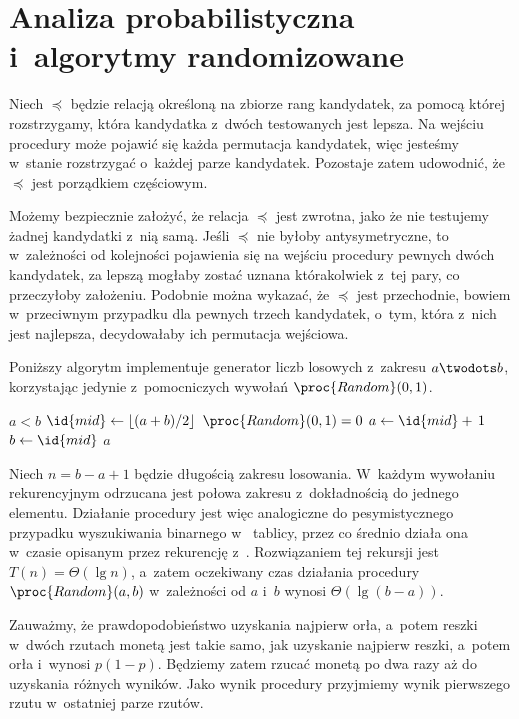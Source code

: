 \chapter{Analiza probabilistyczna i~algorytmy randomizowane}


\exercise %
Niech $\preceq$ będzie relacją określoną na zbiorze rang kandydatek, za pomocą której rozstrzygamy, która kandydatka z~dwóch testowanych jest lepsza. Na wejściu procedury  może pojawić się każda permutacja kandydatek, więc jesteśmy w~stanie rozstrzygać o~każdej parze kandydatek. Pozostaje zatem udowodnić, że $\preceq$ jest porządkiem częściowym.

Możemy bezpiecznie założyć, że relacja $\preceq$ jest zwrotna, jako że nie testujemy żadnej kandydatki z~nią samą. Jeśli $\preceq$ nie byłoby antysymetryczne, to w~zależności od kolejności pojawienia się na wejściu procedury pewnych dwóch kandydatek, za lepszą mogłaby zostać uznana którakolwiek z~tej pary, co przeczyłoby założeniu. Podobnie można wykazać, że $\preceq$ jest przechodnie, bowiem w~przeciwnym przypadku dla pewnych trzech kandydatek, o~tym, która z~nich jest najlepsza, decydowałaby ich permutacja wejściowa.

\exercise %
Poniższy algorytm implementuje generator liczb losowych z~zakresu $a\twodots b$, korzystając jedynie z~pomocniczych wywołań $\proc{Random}(0,1)$.
\begin{codebox}
\li	\While $a<b$
\li		\Do
			$\id{mid}\gets\lfloor(a+b)/2\rfloor$
\li			\If $\proc{Random}(0,1)=0$
\li				\Then $a\gets\id{mid}+\,1$
\li				\Else $b\gets\id{mid}$
				\End
		\End
\li	\Return $a$
\end{codebox}

Niech $n=b-a+1$ będzie długością zakresu losowania. W~każdym wywołaniu rekurencyjnym odrzucana jest połowa zakresu z~dokładnością do jednego elementu. Działanie procedury jest więc analogiczne do pesymistycznego przypadku wyszukiwania binarnego w~ tablicy, przez co średnio działa ona w~czasie opisanym przez rekurencję z~. Rozwiązaniem tej rekursji jest $T(n)=\Theta(\lg n)$, a~zatem oczekiwany czas działania procedury $\proc{Random}(a,b)$ w~zależności od $a$ i~$b$ wynosi $\Theta(\lg(b-a))$.

\exercise %
Zauważmy, że prawdopodobieństwo uzyskania najpierw orła, a~potem reszki w~dwóch rzutach monetą jest takie samo, jak uzyskanie najpierw reszki, a~potem orła i~wynosi $p(1-p)$. Będziemy zatem rzucać monetą po dwa razy aż do uzyskania różnych wyników. Jako wynik procedury przyjmiemy wynik pierwszego rzutu w~ostatniej parze rzutów.

